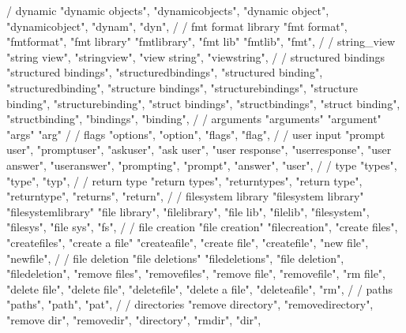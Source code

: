         / dynamic 
        "dynamic objects",
        "dynamicobjects",
        "dynamic object",
        "dynamicobject",
        "dynam",
        "dyn",
        /
        / fmt format library
        "fmt format",
        "fmtformat",
        "fmt library"
        "fmtlibrary",
        "fmt lib"
        "fmtlib",
        "fmt",
        /  
        / string_view
        "string view",
        "stringview",
        "view string",
        "viewstring",
        /
        / structured bindings
        "structured bindings",
        "structuredbindings",
        "structured binding",
        "structuredbinding", 
        "structure bindings",
        "structurebindings", 
        "structure binding", 
        "structurebinding",
        "struct bindings",
        "structbindings",
        "struct binding",
        "structbinding",
        "bindings",
        "binding",
        /
        / arguments 
        "arguments"
        "argument"
        "args"
        "arg"
        /
        / flags 
        "options",
        "option",
        "flags",
        "flag",
        /
        / user input 
        "prompt user",  
        "promptuser",  
        "askuser",  
        "ask user",  
        "user response",  
        "userresponse",  
        "user answer",  
        "useranswer",  
        "prompting",  
        "prompt",  
        "answer",  
        "user",  
        /
        / type 
        "types",  
        "type",  
        "typ",  
        /
        / return type 
        "return types", 
        "returntypes", 
        "return type", 
        "returntype", 
        "returns", 
        "return", 
        /
        / filesystem library
        "filesystem library"
        "filesystemlibrary"
        "file library",
        "filelibrary",
        "file lib", 
        "filelib",
        "filesystem",
        "filesys",
        "file sys",
        "fs",
        / 
        / file creation 
        "file creation"
        "filecreation",
        "create files",
        "createfiles", 
        "create a file"
        "createafile",
        "create file", 
        "createfile",
        "new file", 
        "newfile", 
        /
        / file deletion 
        "file deletions"
        "filedeletions",
        "file deletion",
        "filedeletion", 
        "remove files", 
        "removefiles",
        "remove file",
        "removefile",
        "rm file",
        "delete file",
        "delete file",
        "deletefile",
        "delete a file",
        "deleteafile",
        "rm",
        /
        / paths 
        "paths", 
        "path", 
        "pat",
        /
        / directories
        "remove directory",
        "removedirectory",
        "remove dir",
        "removedir",
        "directory",
        "rmdir",
        "dir",

